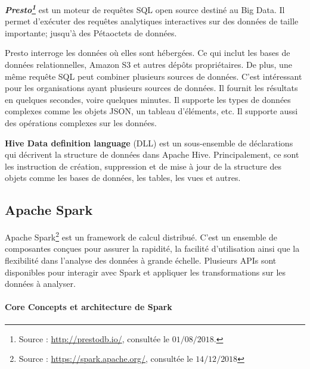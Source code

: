 \begin{tcolorbox}
	\textbf{\textit{Presto\footnote{Source : \url{http://prestodb.io/}, consultée le $01/08/2018$.} }} est un moteur de requêtes SQL open source destiné au Big Data. Il permet d'exécuter des requêtes analytiques interactives sur des données de taille importante; jusqu'à des Pétaoctets de données.
	
	Presto interroge les données où elles sont hébergées. Ce qui inclut les bases de données relationnelles, Amazon S3 et autres dépôts propriétaires. De plus, une même requête SQL peut combiner plusieurs sources de données. C'est intéressant pour les organisations ayant plusieurs sources de données. Il fournit les résultats en quelques secondes, voire quelques minutes.  Il supporte les types de données complexes comme les objets JSON, un tableau d'éléments, etc. Il supporte aussi  des opérations complexes sur les données.
\end{tcolorbox} 


\begin{tcolorbox}
	\textbf{Hive Data definition language} (DLL) est un sous-ensemble de déclarations qui décrivent la structure de données dans Apache Hive.  Principalement, ce sont les instruction de création, suppression et de mise à jour de la structure des objets comme les bases de données, les tables, les vues et autres.
\end{tcolorbox}

\subsection{Apache Spark } \label{apache-spark}


Apache Spark\footnote{Source : \url{https://spark.apache.org/}, consultée le $14/12/2018$} 
est un framework de calcul distribué. C'est un ensemble de composantes conçues pour assurer la rapidité, la facilité d'utilisation ainsi que la flexibilité dans l'analyse des données à grande échelle. Plusieurs APIs sont disponibles pour interagir avec Spark et 
 appliquer les transformations sur les données à analyser. 

\paragraph{Core Concepts et architecture de Spark}

